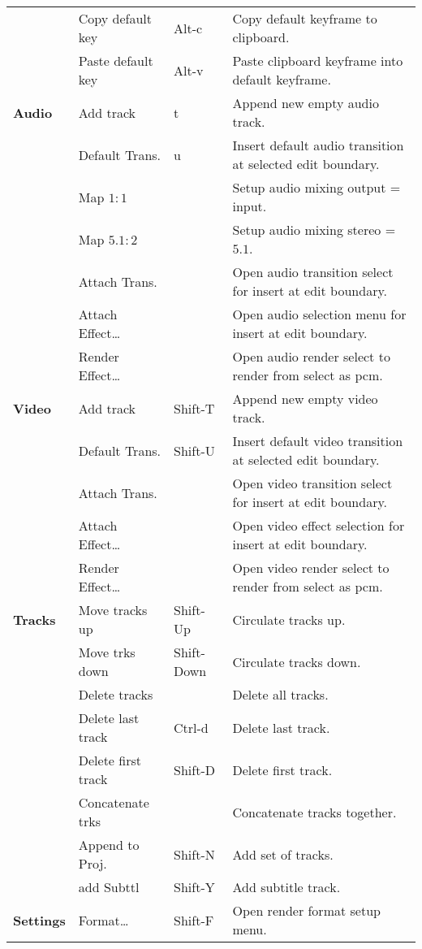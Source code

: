 \begin{longtable}[h]{>{\bfseries}p{}p{}p{}p{}}
  & Copy default key & Alt-c & Copy default keyframe to clipboard. \\
  & Paste default key & Alt-v & Paste clipboard keyframe into default keyframe. \\
  \midrule
  \textcolor{CinBlueText}{Audio} & Add track & t & Append new empty audio track. \\
  & Default Trans. & u & Insert default audio transition at selected edit boundary. \\
  & Map $1:1$ &  & Setup audio mixing output = input. \\
  & Map $5.1:2$ &  & Setup audio mixing stereo = $5.1$. \\
  & Attach Trans. &  & Open audio transition select for insert at edit boundary. \\
  & Attach Effect\dots &  & Open audio selection menu for insert at edit boundary. \\
  & Render Effect\dots &  & Open audio render select to render from select as pcm. \\
  \midrule
  \textcolor{CinBlueText}{Video} & Add track & Shift-T & Append new empty video track. \\
  & Default Trans. & Shift-U & Insert default video transition at selected edit boundary. \\
  & Attach Trans. &  & Open video transition select for insert at edit boundary. \\
  & Attach Effect\dots &  & Open video effect selection for insert at edit boundary. \\
  & Render Effect\dots &  & Open video render select to render from select as pcm. \\
  \midrule
  \textcolor{CinBlueText}{Tracks} & Move tracks up & Shift-Up & Circulate tracks up. \\
  & Move trks down & Shift-Down & Circulate tracks down. \\
  & Delete tracks &  & Delete all tracks. \\
  & Delete last track & Ctrl-d & Delete last track. \\
  & Delete first track & Shift-D & Delete first track. \\
  & Concatenate trks &  & Concatenate tracks together. \\
  & Append to Proj.	 & Shift-N & Add set of tracks. \\
  & add Subttl & Shift-Y & Add subtitle track. \\
  \midrule
  \textcolor{CinBlueText}{Settings} & Format\dots & Shift-F & Open render format setup menu. \\

\end{longtable}
